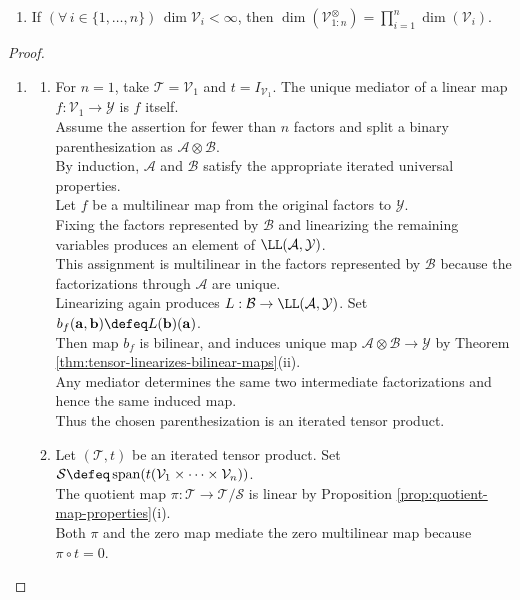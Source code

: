 \begin{theorem}
\begin{enumerate}[label=(\roman*)]
\item If $(\forall\,i\in\{1,\ldots,n\})\,\dim\mathcal{V}_i<\infty$, then $\dim(\mathcal{V}_{1:n}^{\otimes})=\prod\limits_{i=1}^{n}\dim(\mathcal{V}_i)$.
\end{enumerate}
\begin{proof}
\begin{enumerate}[label=(\roman*)]
\setlength{\itemsep}{0pt}
\item
\begin{enumerate}[label=(\alph*)]
\setlength{\itemsep}{0pt}
\item For $n=1$, take $\mathcal{T}=\mathcal{V}_1$ and $t=I_{\mathcal{V}_1}$. The unique mediator of a linear map $f:\mathcal{V}_1\to\mathcal{Y}$ is $f$ itself.\\
Assume the assertion for fewer than $n$ factors and split a binary parenthesization as $\mathcal{A}\otimes\mathcal{B}$.\\
By induction, $\mathcal{A}$ and $\mathcal{B}$ satisfy the appropriate iterated universal properties.\\
Let $f$ be a multilinear map from the original factors to $\mathcal{Y}$.\\
Fixing the factors represented by $\mathcal{B}$ and linearizing the remaining variables produces an element of $\LL(\mathcal{A},\mathcal{Y})$.\\
This assignment is multilinear in the factors represented by $\mathcal{B}$ because the factorizations through $\mathcal{A}$ are unique.\\
Linearizing again produces $L:\mathcal{B}\to\LL(\mathcal{A},\mathcal{Y})$. Set $b_f(\mathbf{a},\mathbf{b})\defeq L(\mathbf{b})(\mathbf{a})$.\\
Then map $b_f$ is bilinear, and induces unique map $\mathcal{A}\otimes\mathcal{B}\to\mathcal{Y}$ by Theorem \ref{thm:tensor-linearizes-bilinear-maps}(ii).\\
Any mediator determines the same two intermediate factorizations and hence the same induced map.\\
Thus the chosen parenthesization is an iterated tensor product.
\item Let $(\mathcal{T},t)$ be an iterated tensor product. Set $\mathcal{S}\defeq\operatorname{span}(t(\mathcal{V}_1\times\cdots\times\mathcal{V}_n))$.\\
The quotient map $\pi:\mathcal{T}\to\mathcal{T}/\mathcal{S}$ is linear by Proposition \ref{prop:quotient-map-properties}(i).\\
Both $\pi$ and the zero map mediate the zero multilinear map because $\pi\circ t=0$.\\

\end{enumerate}
\end{enumerate}
\end{proof}
\end{theorem}
